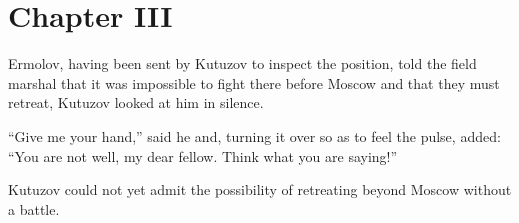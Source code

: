 \chapter*{Chapter III} \ifaudio {}
\fi

 Ermolov, having been sent by Kutuzov to inspect the
position, told the field marshal that it was impossible to fight
there before Moscow and that they must retreat, Kutuzov looked at
him in silence.

``Give me your hand,'' said he and, turning it over so as to feel
the pulse, added: ``You are not well, my dear fellow. Think what
you are saying!''

Kutuzov could not yet admit the possibility of retreating beyond
Moscow without a battle.

